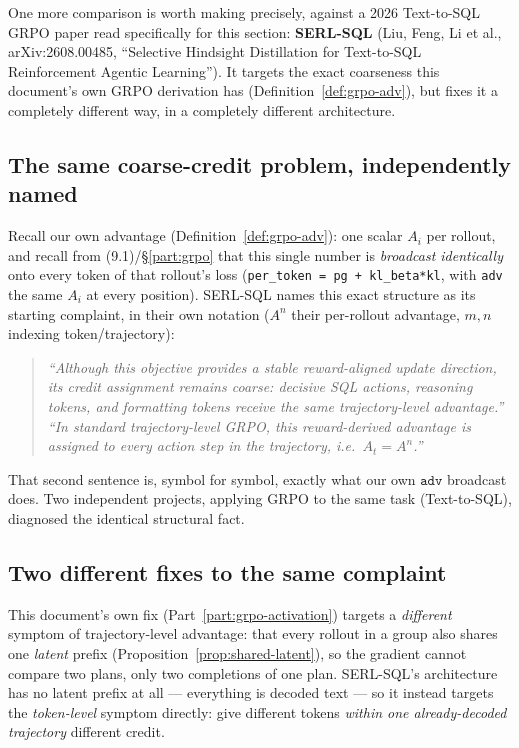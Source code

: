 \documentclass[11pt]{article}
\theoremstyle{definition}
\begin{document}
One more comparison is worth making precisely, against a 2026 Text-to-SQL GRPO paper read specifically for this section: \textbf{SERL-SQL} (Liu, Feng, Li et al., arXiv:2608.00485, ``Selective Hindsight Distillation for Text-to-SQL Reinforcement Agentic Learning''). It targets the exact coarseness this document's own GRPO derivation has (Definition~\ref{def:grpo-adv}), but fixes it a completely different way, in a completely different architecture.

\subsection{The same coarse-credit problem, independently named}

Recall our own advantage (Definition~\ref{def:grpo-adv}): one scalar $A_i$ per rollout, and recall from (9.1)/\S\ref{part:grpo} that this single number is \emph{broadcast identically} onto every token of that rollout's loss (\texttt{per\_token = pg + kl\_beta*kl}, with \texttt{adv} the same $A_i$ at every position). SERL-SQL names this exact structure as its starting complaint, in their own notation ($A^n$ their per-rollout advantage, $m,n$ indexing token/trajectory):

\begin{quote}
\itshape ``Although this objective provides a stable reward-aligned update direction, its credit assignment remains coarse: decisive SQL actions, reasoning tokens,
and formatting tokens receive the same trajectory-level advantage.'' \\
``In standard trajectory-level GRPO, this reward-derived advantage is assigned to every action step in the trajectory, i.e.\ $A_t = A^n$.''
\end{quote}

That second sentence is, symbol for symbol, exactly what our own $\texttt{adv}$ broadcast does. Two independent projects, applying GRPO to the same task (Text-to-SQL), diagnosed the identical structural fact.

\subsection{Two different fixes to the same complaint}

This document's own fix (Part~\ref{part:grpo-activation}) targets a \emph{different} symptom of trajectory-level advantage: that every rollout in a group also shares one \emph{latent} prefix (Proposition~\ref{prop:shared-latent}), so the gradient cannot compare two plans, only two completions of one plan. SERL-SQL's architecture has no latent prefix at all --- everything is decoded text --- so it instead targets the \emph{token-level} symptom directly: give different tokens \emph{within one already-decoded trajectory} different credit.
\end{document}
